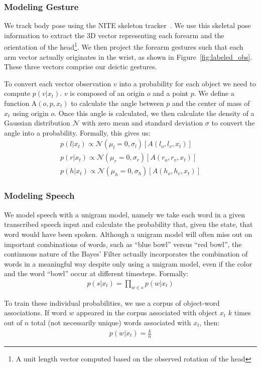 \documentclass[a4paper, 11pt]{article} %
\begin{document}
\subsubsection{Modeling Gesture}
We track body pose using the NITE skeleton tracker~\citep{openni}. We use this skeletal pose information to extract the 3D vector representing each forearm and the orientation of the head\footnote{A unit length vector computed based on the observed rotation of the head}. We then project the forearm gestures such that each arm vector actually originates in the wrist, as shown in Figure~\ref{fig:labeled_obs}. These three vectors comprise our deictic gestures.

To convert each vector observation $v$ into a probability for each object we need to compute $p(v | x_t)$. $v$ is composed of an origin $o$ and a point $p$. We define a function $\mbox{A}(o, p, x_t)$ to calculate the angle between $p$ and the center of mass of $x_t$ using origin $o$. Once this angle is calculated, we then calculate the density of a Gaussian  distribution $\mathcal{N}$ with zero mean and standard deviation $\sigma$ to convert the angle into a probability. Formally, this gives us:
\begin{align}
p(l | x_t) \propto \mathcal{N}(\mu_l=0, \sigma_l)[A(l_o, l_v, x_t)]\\
p(r | x_t) \propto \mathcal{N}(\mu_r=0, \sigma_r)[A(r_o, r_v, x_t)]\\
p(h | x_t) \propto \mathcal{N}(\mu_h=0, \sigma_h)[A(h_o, h_v, x_t)]
\end{align}
\subsubsection{Modeling Speech}
We model speech with a unigram model, namely we take each word in a given transcribed speech input and calculate the probability that, given the state, that word would have been spoken. Although a unigram model will often miss out on important combinations of words, such as ``blue bowl'' versus ``red bowl'', the continuous nature of the Bayes' Filter actually incorporates the combination of words in a meaningful way despite only using a unigram model, even if the color and the word ``bowl'' occur at different timesteps. Formally:
\begin{align}
p(s |x_t) = \displaystyle \prod_{w \in s} p(w | x_t)
\end{align}

To train these individual probabilities, we use a corpus of object-word associations. If word $w$ appeared in the corpus associated with object $x_t$ $k$ times out of $n$ total (not necessarily unique) words associated with $x_t$, then:
\begin{align}
p(w | x_t) = \frac{k}{n}
\end{align}
\end{document}
